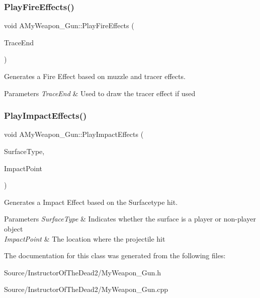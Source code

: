 \subsubsection{\texorpdfstring{Play\+Fire\+Effects()}{PlayFireEffects()}}
{\footnotesize\ttfamily void A\+My\+Weapon\+\_\+\+Gun\+::\+Play\+Fire\+Effects (\begin{DoxyParamCaption}\item[{F\+Vector}]{Trace\+End }\end{DoxyParamCaption})\hspace{0.3cm}{\ttfamily [protected]}}

Generates a Fire Effect based on muzzle and tracer effects.


\begin{DoxyParams}{Parameters}
{\em Trace\+End} & Used to draw the tracer effect if used \\
\hline
\end{DoxyParams}
\mbox{\label{class_a_my_weapon___gun_a2a734edf94e9c1aa40194c60a6116c99}} 
\subsubsection{\texorpdfstring{Play\+Impact\+Effects()}{PlayImpactEffects()}}
{\footnotesize\ttfamily void A\+My\+Weapon\+\_\+\+Gun\+::\+Play\+Impact\+Effects (\begin{DoxyParamCaption}\item[{E\+Physical\+Surface}]{Surface\+Type,  }\item[{F\+Vector}]{Impact\+Point }\end{DoxyParamCaption})\hspace{0.3cm}{\ttfamily [protected]}}

Generates a Impact Effect based on the Surfacetype hit.


\begin{DoxyParams}{Parameters}
{\em Surface\+Type} & Indicates whether the surface is a player or non-\/player object \\
\hline
{\em Impact\+Point} & The location where the projectile hit \\
\hline
\end{DoxyParams}


The documentation for this class was generated from the following files\+:\begin{DoxyCompactItemize}
\item 
Source/\+Instructor\+Of\+The\+Dead2/My\+Weapon\+\_\+\+Gun.\+h\item 
Source/\+Instructor\+Of\+The\+Dead2/My\+Weapon\+\_\+\+Gun.\+cpp\end{DoxyCompactItemize}

